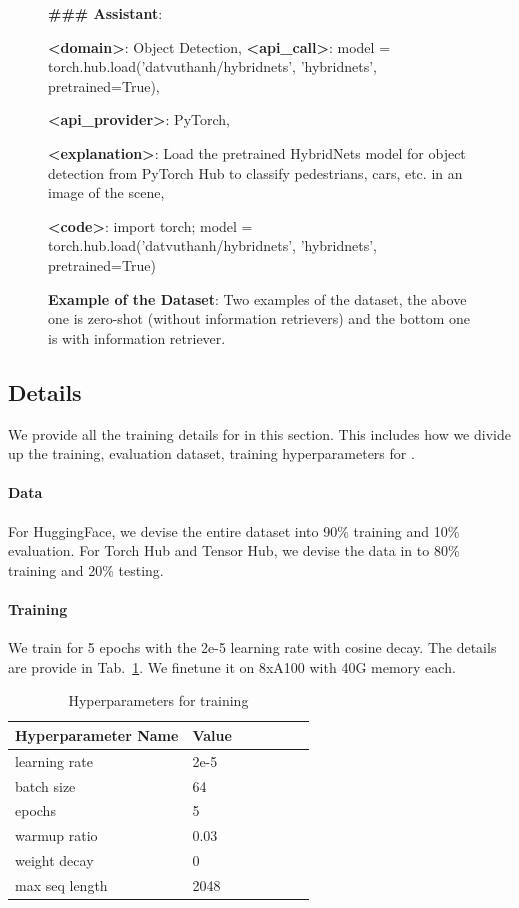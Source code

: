 \begin{figure}
\begin{tcolorbox}
    \textbf{\#\#\# Assistant}: 
    
    \textbf{<domain>}: Object Detection, \textbf{<api\_call>}: model = torch.hub.load('datvuthanh/hybridnets', 'hybridnets', pretrained=True),
    
    \textbf{<api\_provider>}: PyTorch,
    
    \textbf{<explanation>}: Load the pretrained HybridNets model for object detection from PyTorch Hub to classify pedestrians, cars, etc. in an image of the scene, 
    
    \textbf{<code>}: import torch; model = torch.hub.load('datvuthanh/hybridnets', 'hybridnets', pretrained=True)
\end{tcolorbox}
    \caption{\textbf{Example of the Dataset}: Two examples of the dataset, the above one is zero-shot (without information retrievers) and the bottom one is with information retriever. }
    \label{fig:data_exp}
\end{figure}

\subsection{\gorilla{} Details}
We provide all the training details for \gorilla{} in this section. This includes how we divide up the training, evaluation dataset, training hyperparameters for \gorilla{}.

\paragraph{Data} For HuggingFace, we devise the entire dataset into 90\% training and 10\% evaluation. For Torch Hub and Tensor Hub, we devise the data in to 80\% training and 20\% testing. 

\paragraph{Training}
We train \gorilla for 5 epochs with the 2e-5 learning rate with cosine decay. The details are provide in Tab.~\ref{tab:hyperparameter}. We finetune it on 8xA100 with 40G memory each. 

\begin{table}[!htb]
\caption{Hyperparameters for training \gorilla{} }
\footnotesize
\setlength\tabcolsep{3.5pt}
\label{tab:hyperparameter}
\centering
\begin{tabular}{p{5cm}p{3cm}p{3cm}p{2.5cm}p{2.5cm}p{2cm}p{2cm}}
\toprule
Hyperparameter Name & Value \\ 
\midrule
learning rate & 2e-5 \\
batch size & 64 \\
epochs & 5 \\
warmup ratio & 0.03 \\
weight decay & 0 \\
max seq length & 2048 \\

\bottomrule 
\end{tabular}
\end{table}



